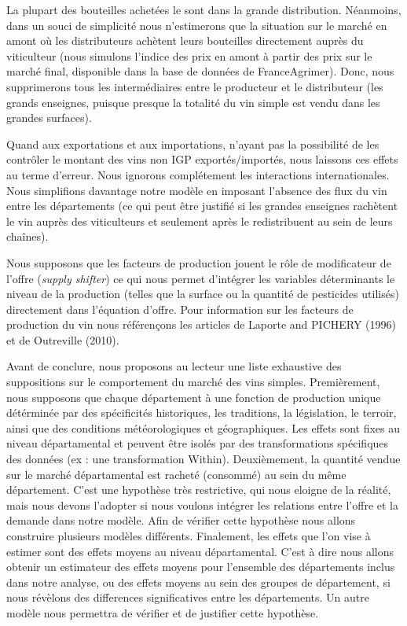 \documentclass[11pt,]{article}
\begin{document}
La plupart des bouteilles achetées le sont dans la grande distribution.
Néanmoins, dans un souci de simplicité nous n'estimerons que la
situation sur le marché en amont où les distributeurs achètent leurs
bouteilles directement auprès du viticulteur (nous simulons l'indice des
prix en amont à partir des prix sur le marché final, disponible dans la
base de données de FranceAgrimer). Donc, nous supprimerons tous les
intermédiaires entre le producteur et le distributeur (les grands
enseignes, puisque presque la totalité du vin simple est vendu dans les
grandes surfaces).

Quand aux exportations et aux importations, n'ayant pas la possibilité
de les contrôler le montant des vins non IGP exportés/importés, nous
laissons ces effets au terme d'erreur. Nous ignorons complétement les
interactions internationales. Nous simplifions davantage notre modèle en
imposant l'absence des flux du vin entre les départements (ce qui peut
être justifié si les grandes enseignes rachètent le vin auprès des
viticulteurs et seulement après le redistribuent au sein de leurs
chaînes).

Nous supposons que les facteurs de production jouent le rôle de
modificateur de l'offre (\emph{supply shifter}) ce qui nous permet
d'intégrer les variables déterminants le niveau de la production (telles
que la surface ou la quantité de pesticides utilisés) directement dans
l'équation d'offre. Pour information sur les facteurs de production du
vin nous référençons les articles de Laporte and PICHERY (1996) et de
Outreville (2010).

Avant de conclure, nous proposons au lecteur une liste exhaustive des
suppositions sur le comportement du marché des vins simples.
Premièrement, nous supposons que chaque département à une fonction de
production unique détérminée par des spécificités historiques, les
traditions, la législation, le terroir, ainsi que des conditions
météorologiques et géographiques. Les effets sont fixes au niveau
départamental et peuvent être isolés par des transformations spécifiques
des données (ex : une transformation Within). Deuxièmement, la quantité
vendue sur le marché départamental est racheté (consommé) au sein du
même département. C'est une hypothèse très restrictive, qui nous eloigne
de la réalité, mais nous devons l'adopter si nous voulons intégrer les
relations entre l'offre et la demande dans notre modèle. Afin de
vérifier cette hypothèse nous allons construire plusieurs modèles
différents. Finalement, les effets que l'on vise à estimer sont des
effets moyens au niveau départamental. C'est à dire nous allons obtenir
un estimateur des effets moyens pour l'ensemble des départements inclus
dans notre analyse, ou des effets moyens au sein des groupes de
département, si nous révèlons des differences significatives entre les
départements. Un autre modèle nous permettra de vérifier et de justifier
cette hypothèse.
\end{document}
